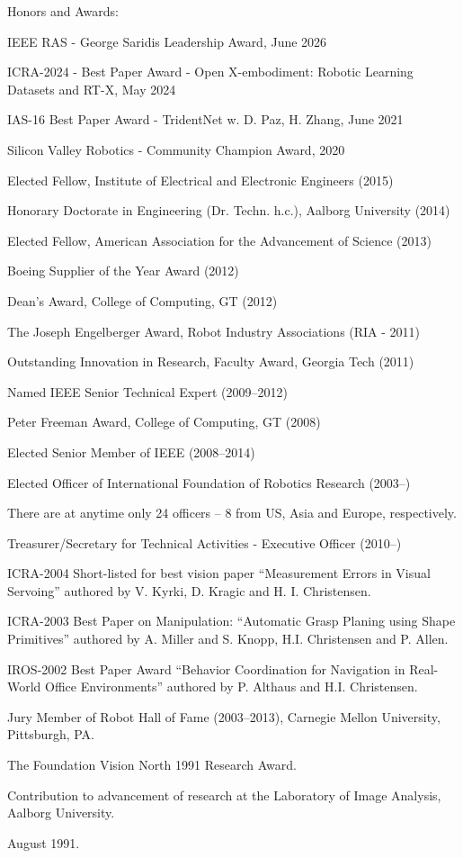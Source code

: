 \documentclass{article}
\newenvironment{sublist}{%
  \begin{list}{}{%
      \setlength{\itemsep}{0em}\setlength{\parsep}{0em}%
      \setlength{\topsep}{0em}\setlength{\parskip}{0em}%
    }%
}%
{ \end{list} }
\begin{document}
\begin{cv}
\begin{cvlist}{Honors and Awards:}
		\item IEEE RAS - George Saridis Leadership Award, June 2026
		\item ICRA-2024 - Best Paper Award - Open X-embodiment: Robotic Learning Datasets and RT-X, May 2024
		\item IAS-16 Best Paper Award - TridentNet w. D. Paz, H. Zhang, June 2021
		\item Silicon Valley Robotics - Community Champion Award, 2020
		\item Elected Fellow, Institute of Electrical and Electronic Engineers (2015)
		\item Honorary Doctorate in Engineering (Dr. Techn. h.c.), Aalborg University (2014)
		\item Elected Fellow, American Association for the Advancement of Science (2013)
		\item Boeing Supplier of the Year Award (2012)
		\item Dean's Award, College of Computing, GT (2012)
		\item The Joseph Engelberger Award, Robot Industry Associations (RIA - 2011)
		\item Outstanding Innovation in Research, Faculty Award, Georgia Tech (2011)
		\item Named IEEE Senior Technical Expert (2009--2012)
		\item Peter Freeman Award, College of Computing, GT (2008)
		\item Elected Senior Member of IEEE (2008--2014)
		\item Elected Officer of International Foundation of Robotics Research
		(2003--)
		\begin{sublist}
			\item There are at anytime only 24 officers -- 8 from US, Asia and Europe,
			respectively.
			\item Treasurer/Secretary for Technical Activities - Executive
			Officer (2010--)
		\end{sublist}
		\item ICRA-2004 Short-listed for best vision paper ``Measurement
		Errors in Visual Servoing'' authored by V. Kyrki, D. Kragic and H.
		I. Christensen.
		\item ICRA-2003 Best Paper on Manipulation:  ``Automatic
		Grasp Planing using Shape Primitives'' authored by A. Miller and
		S. Knopp, H.I. Christensen and P. Allen.
		\item IROS-2002 Best Paper Award ``Behavior Coordination for
		Navigation in Real-World Office Environments'' authored by
		P. Althaus and H.I. Christensen.
		\item Jury Member of Robot Hall of Fame (2003--2013), Carnegie Mellon
		University, Pittsburgh, PA.
		\item The Foundation Vision North 1991 Research Award.
		\begin{sublist}
			\item Contribution to advancement of research at the Laboratory of
			Image Analysis, Aalborg University.
			\item August 1991.
		\end{sublist}
	\end{cvlist}
\end{cv}
\end{document}
